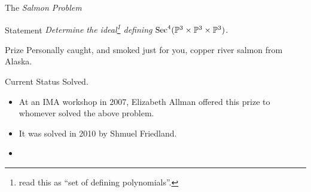 \begin{frame}{The \emph{Salmon Problem}}

\begin{block}{Statement}
    \emph{Determine the ideal\footnote{read this as ``set of defining polynomials''.} defining $\operatorname{Sec}^{4}(\mathbb{P}^{3} \times \mathbb{P}^{3} \times \mathbb{P}^{3})$.}
\end{block}

\begin{block}{Prize}
    Personally caught, and smoked just for you, copper river salmon from Alaska.
\end{block}

\begin{block}{Current Status}
    Solved.
\end{block}

\begin{itemize}
    \item At an IMA workshop in 2007, Elizabeth Allman offered this prize to whomever solved the above problem.
    \item It was solved in 2010 by Shmuel Friedland.
\end{itemize}

\end{frame}

\begin{frame}{}

\begin{itemize}
    \item 
\end{itemize}

\end{frame}